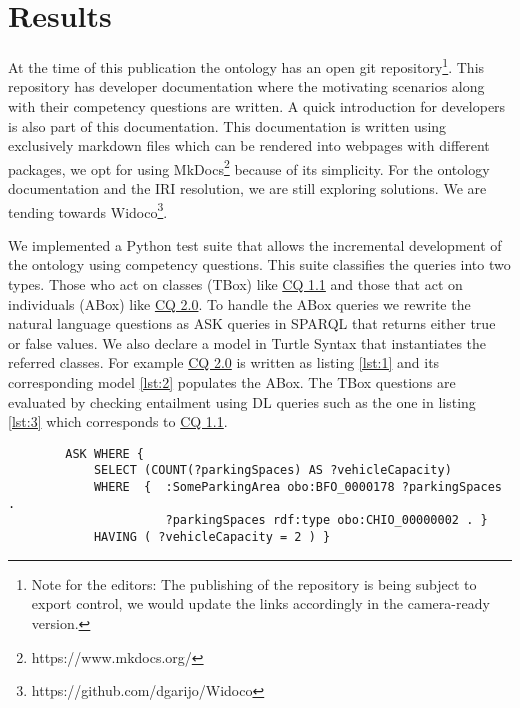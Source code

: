 \section{Results}
\label{results}

At the time of this publication the ontology has an open git
repository\footnote{Note for the editors: The publishing of the repository is
being subject to export control, we would update the links accordingly in the
camera-ready version. }. This repository has developer documentation where the
motivating scenarios along with their competency questions are written. A quick
introduction for developers is also part of this documentation. This
documentation is written using exclusively markdown files which can be rendered
into webpages with different packages, we opt for using
MkDocs\footnote{https://www.mkdocs.org/} because of its simplicity. For the
ontology documentation and the IRI resolution, we are still exploring solutions.
We are tending towards Widoco\footnote{https://github.com/dgarijo/Widoco}.

We implemented a Python test suite that allows the incremental development of
the ontology using competency questions. This suite classifies the queries into
two types. Those who act on classes (TBox) like \hyperref[CQ1.1]{CQ 1.1} and
those that act on individuals (ABox) like \hyperref[CQ2.0]{CQ 2.0}. To handle
the ABox queries we rewrite the natural language questions as ASK queries in
SPARQL  that returns either true or false values. We also declare a model in
Turtle Syntax that instantiates the referred classes. For example
\hyperref[CQ2.0]{CQ 2.0} is written as listing \ref{lst:1} and its corresponding
model \ref{lst:2} populates the ABox. The TBox questions are evaluated by
checking entailment using DL queries such as the one in listing \ref{lst:3}
which corresponds to \hyperref[CQ1.1]{CQ 1.1}.

\begin{listing}[h]
    
    \begin{verbatim}
        ASK WHERE {
            SELECT (COUNT(?parkingSpaces) AS ?vehicleCapacity)  
            WHERE  {  :SomeParkingArea obo:BFO_0000178 ?parkingSpaces . 
                      ?parkingSpaces rdf:type obo:CHIO_00000002 . }
            HAVING ( ?vehicleCapacity = 2 ) }
    \end{verbatim}
    \caption{Example ABox query. (Given a parking area with two parking places) What is the (vehicle) capacity of parking lot P? (2). The namespaces are omitted.}
    \label{lst:1}
\end{listing}

